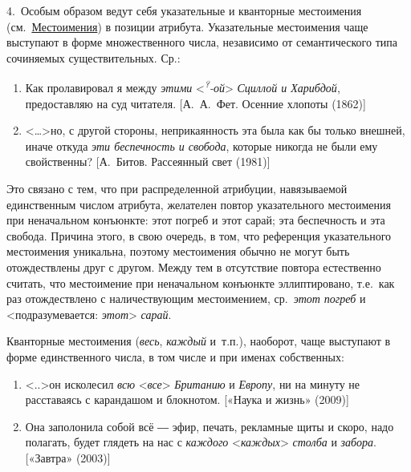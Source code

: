 4.~Особым образом ведут себя указательные и кванторные местоимения
(см.~\underline{Местоимения}) в позиции атрибута. Указательные
местоимения чаще выступают в форме множественного числа, независимо от
семантического типа сочиняемых существительных. Ср.:

\begin{enumerate}
\def\labelenumi{(\arabic{enumi})}
\setcounter{enumi}{133}
\item
  Как пролавировал я между \textit{этими}
  \textless{}\textit{\textsuperscript{?}-ой}\textgreater{} \textit{Сциллой и
  Харибдой}, предоставляю на суд читателя. {[}А.~А.~Фет. Осенние хлопоты
  (1862){]}
\item
  \textless\ldots\textgreater но, с другой стороны, неприкаянность эта
  была как бы только внешней, иначе откуда \textit{эти беспечность и
  свобода}, которые никогда не были ему свойственны? {[}А.~Битов.
  Рассеянный свет (1981){]}
\end{enumerate}

Это связано с тем, что при распределенной атрибуции, навязываемой
единственным числом атрибута, желателен повтор указательного местоимения
при неначальном конъюнкте: этот погреб и этот сарай; эта беспечность и
эта свобода. Причина этого, в свою очередь, в том, что референция
указательного местоимения уникальна, поэтому местоимения обычно не могут
быть отождествлены друг с другом. Между тем в отсутствие повтора
естественно считать, что местоимение при неначальном конъюнкте
эллиптировано, т.е.~как раз отождествлено с наличествующим местоимением,
ср.~\textit{этот погреб} и \textless подразумевается:
\textit{этот}\textgreater{} \textit{сарай}.

Кванторные местоимения (\textit{весь}, \textit{каждый} и~т.п.), наоборот,
чаще выступают в форме единственного числа, в том числе и при именах
собственных:

\begin{enumerate}
\def\labelenumi{(\arabic{enumi})}
\setcounter{enumi}{135}
\item
  \textless..\textgreater он исколесил \textit{всю}
  \textless*\textit{все}\textgreater{} \textit{Британию} и \textit{Европу}, ни
  на минуту не расставаясь с карандашом и блокнотом. {[}«Наука и жизнь»
  (2009){]}
\item
  Она заполонила собой всё ― эфир, печать, рекламные щиты и скоро, надо
  полагать, будет глядеть на нас с \textit{каждого}
  \textless*\textit{каждых}\textgreater{} \textit{столба} и \textit{забора}.
  {[}«Завтра» (2003){]}
\end{enumerate}

